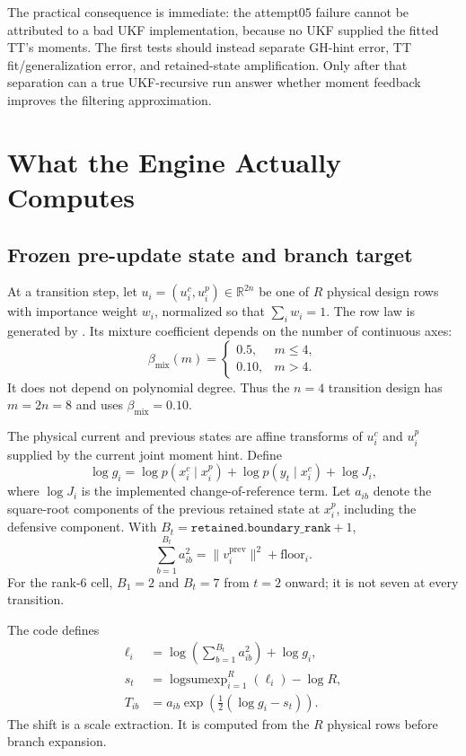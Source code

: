 \documentclass[11pt]{article}
\begin{document}
The practical consequence is immediate: the attempt05 failure cannot be
attributed to a bad UKF implementation, because no UKF supplied the fitted
TT's moments.  The first tests should instead separate GH-hint error, TT
fit/generalization error, and retained-state amplification.  Only after that
separation can a true UKF-recursive run answer whether moment feedback improves
the filtering approximation.

\section{What the Engine Actually Computes}

\subsection{Frozen pre-update state and branch target}

At a transition step, let $u_i=(u_i^c,u_i^p)\in\mathbb{R}^{2n}$ be one of
$R$ physical design rows with importance weight $w_i$, normalized so that
$\sum_iw_i=1$. The row law is generated by . Its
mixture coefficient depends on the number of continuous axes:
\begin{equation}
\beta_{\mathrm{mix}}(m)=
\begin{cases}
0.5,&m\leq4,\\
0.10,&m>4.
\end{cases}
\end{equation}
It does not depend on polynomial degree. Thus the $n=4$ transition design has
$m=2n=8$ and uses $\beta_{\mathrm{mix}}=0.10$.

The physical current and previous states are affine transforms of $u_i^c$ and
$u_i^p$ supplied by the current joint moment hint. Define
\begin{equation}
\log g_i
=\log p(x_i^c\mid x_i^p)+\log p(y_t\mid x_i^c)+\log J_i,
\end{equation}
where $\log J_i$ is the implemented change-of-reference term. Let $a_{ib}$
denote the square-root components of the previous retained state at $x_i^p$,
including the defensive component. With
$B_t=\texttt{retained.boundary\_rank}+1$,
\begin{equation}
\sum_{b=1}^{B_t}a_{ib}^2
=\|v_i^{\mathrm{prev}}\|^2+\mathrm{floor}_i.
\end{equation}
For the rank-6 cell, $B_1=2$ and $B_t=7$ from $t=2$ onward; it is not seven at
every transition.

The code defines
\begin{align}
\ell_i
&=\log\!\left(\sum_{b=1}^{B_t}a_{ib}^2\right)+\log g_i,\\
s_t
&=\operatorname{logsumexp}_{i=1}^R(\ell_i)-\log R,\\
T_{ib}
&=a_{ib}\exp\!\left(\tfrac12(\log g_i-s_t)\right).
\label{eq:branch-target}
\end{align}
The shift is a scale extraction. It is computed from the $R$ physical rows
before branch expansion.
\end{document}
